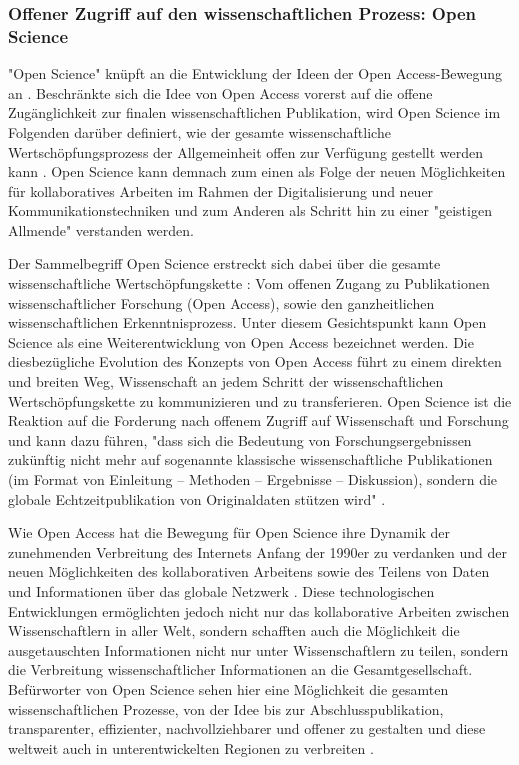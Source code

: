 \subsubsection{Offener Zugriff auf den wissenschaftlichen Prozess: Open Science}

"Open Science" knüpft an die Entwicklung der Ideen der Open Access-Bewegung an \cite{garcia_2010_open}. Beschränkte sich die Idee von Open Access vorerst auf die offene Zugänglichkeit zur finalen wissenschaftlichen Publikation, wird Open Science im Folgenden darüber definiert, wie der gesamte wissenschaftliche Wertschöpfungsprozess der Allgemeinheit offen zur Verfügung gestellt werden kann \cite{grand_2012_open}. Open Science kann demnach zum einen als Folge der neuen Möglichkeiten für kollaboratives Arbeiten im Rahmen der Digitalisierung und neuer Kommunikationstechniken und zum Anderen als Schritt hin zu einer "geistigen Allmende" \cite{naeder_2010_open} verstanden werden.

Der Sammelbegriff Open Science erstreckt sich dabei über die gesamte wissenschaftliche Wertschöpfungskette \cite{Scheliga_2014}: Vom offenen Zugang zu Publikationen wissenschaftlicher Forschung (Open Access), sowie den ganzheitlichen wissenschaftlichen Erkenntnisprozess. Unter diesem Gesichtspunkt kann Open Science als eine Weiterentwicklung von Open Access bezeichnet werden. Die diesbezügliche Evolution des Konzepts von Open Access führt zu einem direkten und breiten Weg, Wissenschaft an jedem Schritt der wissenschaftlichen Wertschöpfungskette zu kommunizieren und zu transferieren. Open Science ist die Reaktion auf die Forderung nach offenem Zugriff auf Wissenschaft und Forschung und kann dazu führen, "dass sich die Bedeutung von Forschungsergebnissen zukünftig nicht mehr auf sogenannte klassische wissenschaftliche Publikationen (im Format von Einleitung – Methoden – Ergebnisse – Diskussion), sondern die globale Echtzeitpublikation von Originaldaten stützen wird" \cite{Stengel_2013}.

Wie Open Access hat die Bewegung für Open Science ihre Dynamik der zunehmenden Verbreitung des Internets Anfang der 1990er zu verdanken \cite{Lievrouw_2010} und der neuen Möglichkeiten des kollaborativen Arbeitens sowie des Teilens von Daten und Informationen über das globale Netzwerk \cite{Meyer_2013}. Diese technologischen Entwicklungen ermöglichten jedoch nicht nur das kollaborative Arbeiten zwischen Wissenschaftlern in aller Welt, sondern schafften auch die Möglichkeit die ausgetauschten Informationen nicht nur unter Wissenschaftlern zu teilen, sondern die Verbreitung wissenschaftlicher Informationen an die Gesamtgesellschaft. Befürworter von Open Science sehen hier eine Möglichkeit die gesamten wissenschaftlichen Prozesse, von der Idee bis zur Abschlusspublikation, transparenter, effizienter, nachvollziehbarer und offener zu gestalten \cite{Woelfle_2011} und diese weltweit auch in unterentwickelten Regionen zu verbreiten \cite{yiotis_2013_open}.

